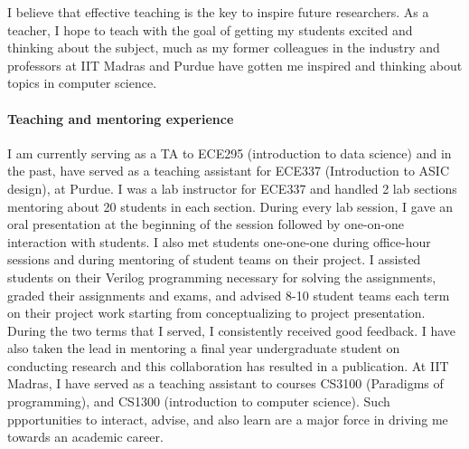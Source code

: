 I believe that effective teaching is the key to inspire future researchers. 
As a teacher, I hope to teach with the goal of getting my students excited and thinking about the subject, much as my former colleagues in the industry and professors at IIT Madras and Purdue have gotten me inspired and thinking about topics in computer science. 

\paragraph{Teaching and mentoring experience}
I am currently serving as a TA to ECE295 (introduction to data science) and in the past, have served as a teaching assistant for ECE337 (Introduction to ASIC design), at Purdue. 
I was a lab instructor for ECE337 and handled 2 lab sections mentoring about 20 students in each section. 
During every lab session, I gave an oral presentation at the beginning of the session followed by one-on-one interaction with students. 
I also met students one-one-one during office-hour sessions and during mentoring of student teams on their project. 
I assisted students on their Verilog programming necessary for solving the assignments, graded their assignments and exams, and advised 8-10 student teams each term on their project work starting from conceptualizing to project presentation.
During the two terms that I served, I consistently received good feedback.  
I have also taken the lead in mentoring a final year undergraduate student on conducting research and this collaboration has resulted in a publication. 
At IIT Madras, I have served as a teaching assistant to courses CS3100 (Paradigms of programming), and CS1300 (introduction to computer science).
Such ppportunities to interact, advise, and also learn are a major force in driving me towards an academic career.

